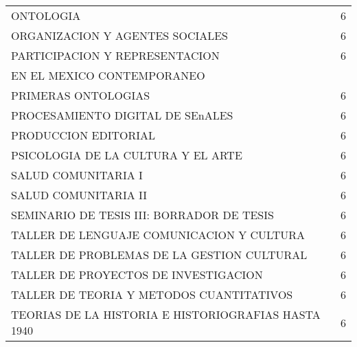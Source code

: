 \documentclass[12pt]{article}
\begin{document}
\begin{table}[ht]
{\begin{tabular}{lr}
  ONTOLOGIA & 6 \\ 
  ORGANIZACION Y AGENTES SOCIALES & 6 \\ 
  PARTICIPACION Y REPRESENTACION & 6 \\ 
   EN EL MEXICO CONTEMPORANEO &  \\ 
  PRIMERAS ONTOLOGIAS & 6 \\ 
  PROCESAMIENTO DIGITAL DE SEnALES & 6 \\ 
  PRODUCCION EDITORIAL & 6 \\ 
  PSICOLOGIA DE LA CULTURA Y EL ARTE & 6 \\ 
  SALUD COMUNITARIA I & 6 \\ 
  SALUD COMUNITARIA II & 6 \\ 
  SEMINARIO DE TESIS III: BORRADOR DE TESIS & 6 \\ 
  TALLER DE LENGUAJE COMUNICACION Y CULTURA & 6 \\ 
  TALLER DE PROBLEMAS DE LA GESTION CULTURAL & 6 \\ 
  TALLER DE PROYECTOS DE INVESTIGACION & 6 \\ 
  TALLER DE TEORIA Y METODOS CUANTITATIVOS & 6 \\ 
  TEORIAS DE LA HISTORIA E HISTORIOGRAFIAS HASTA 1940 & 6 \\ 
    \hline
\end{tabular}}
\end{table}
\end{document}
